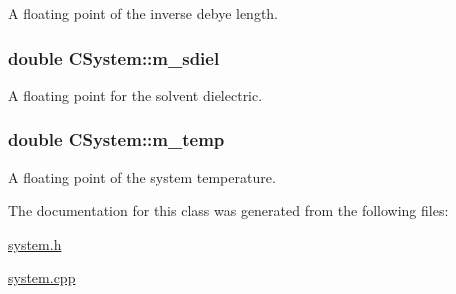 A floating point of the inverse debye length. 

\hypertarget{classCSystem_a759e213e8fc55da6be14382b90864e06}{
\subsubsection[{m\-\_\-sdiel}]{\setlength{\rightskip}{0pt plus 5cm}double C\-System\-::m\-\_\-sdiel\hspace{0.3cm}{\ttfamily [static]}}}\label{classCSystem_a759e213e8fc55da6be14382b90864e06}


A floating point for the solvent dielectric. 

\hypertarget{classCSystem_aa6fbb1e26af0341048dbdc26e6e44b44}{
\subsubsection[{m\-\_\-temp}]{\setlength{\rightskip}{0pt plus 5cm}double C\-System\-::m\-\_\-temp\hspace{0.3cm}{\ttfamily [static]}}}\label{classCSystem_aa6fbb1e26af0341048dbdc26e6e44b44}


A floating point of the system temperature. 



The documentation for this class was generated from the following files\-:\begin{DoxyCompactItemize}
\item 
\hyperlink{system_8h}{system.\-h}\item 
\hyperlink{system_8cpp}{system.\-cpp}\end{DoxyCompactItemize}
